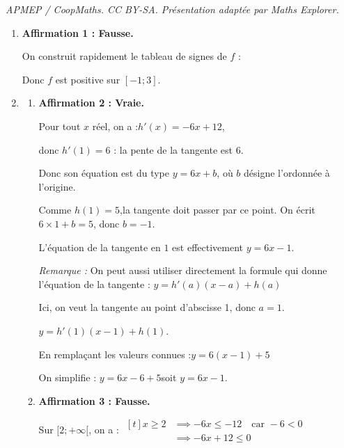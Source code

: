\documentclass[10pt]{article}
\begin{document}
\noindent\textit{APMEP / CoopMaths. CC BY-SA. Présentation adaptée par Maths Explorer.}\par\medskip
\begin{enumerate}[itemsep = 5mm]
		\item \textbf{Affirmation 1 : Fausse.}

		On construit rapidement le tableau de signes de $f$ :
		\begin{center}
		\end{center}
		Donc $f$ est positive sur \mbox{$[-1;3]$}.

		\item \begin{enumerate}
			\item \textbf{Affirmation 2 : Vraie.}

			Pour tout $x$ réel, on a :\quad \mbox{$h'(x) = -6x+12$},

			donc \quad \mbox{$h'(1) = 6$} : \quad la pente  de la tangente est $6$.

			Donc son équation est du type \quad \mbox{$y = 6x+b$}, \quad où $b$ désigne l'ordonnée à l'origine.

			Comme \quad \mbox{$h(1) = 5$},\quad la tangente doit passer par ce point. On écrit \mbox{$6\times1+b = 5$}, donc \mbox{$b = -1$}.

			L'équation de la tangente en $1$ est effectivement \mbox{$y = 6x-1$}.

			\emph{Remarque :} On peut aussi utiliser directement la formule qui donne l'équation de la tangente : \quad $y = h'(a)(x - a) + h(a)$

			Ici, on veut la tangente au point d'abscisse 1, donc $a = 1$.

			$y = h'(1)(x - 1) + h(1)$.

			En remplaçant les valeurs connues :\quad $y = 6(x - 1) + 5$

			On simplifie : \quad $y = 6x - 6 + 5$\quad soit \quad $y = 6x - 1$.

			\item \textbf{Affirmation 3 : Fausse.}

			Sur $[2 ; +\infty[$, on a : \quad $\begin{aligned}[t]
				x \geqslant 2
				&\implies -6x \leqslant -12 \quad \text{car } -6 < 0\\
				&\implies -6x + 12 \leqslant 0
			\end{aligned}$


\end{enumerate}
\end{enumerate}
\end{document}
